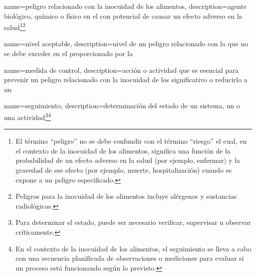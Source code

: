 {
    name={peligro relacionado con la inocuidad de los alimentos},
    description={agente biológico, químico o físico en el  con potencial de causar un efecto adverso en la salud\footnote{El término “peligro” no se debe confundir con el término “riesgo” el cual, en el contexto de la inocuidad de los alimentos, significa una función de la probabilidad de un efecto adverso en la salud (por ejemplo, enfermar) y la gravedad de ese efecto (por ejemplo, muerte, hospitalización) cuando se expone a un peligro especificado.}\footnote{Peligros para la inocuidad de los alimentos incluye alérgenos y sustancias radiológicas.}}
}

{
    name={nivel aceptable},
    description={nivel de un peligro relacionado con la  que no se debe exceder en el  proporcionado por la }
}

{
    name={medida de control},
    description={acción o actividad que es esencial para prevenir un peligro relacionado con la inocuidad de los   significativo o reducirlo a un }
}

{
    name={seguimiento},
    description={determinación del estado de un sistema, un  o una actividad\footnote{Para determinar el estado, puede ser necesario verificar, supervisar u observar críticamente.}\footnote{En el contexto de la inocuidad de los alimentos, el seguimiento se lleva a cabo con una secuencia planificada de observaciones o mediciones para evaluar si un proceso está funcionando según lo previsto.}}
}



